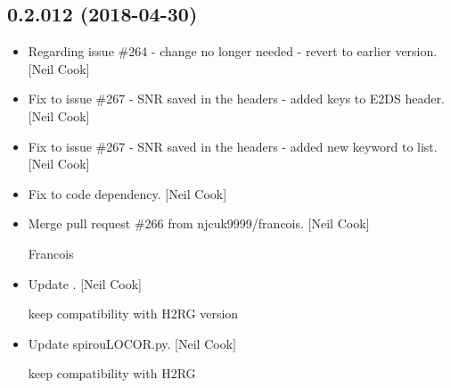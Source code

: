 \documentclass[a4paper,10pt,english]{report}
\begin{document}
\subsection{0.2.012 (2018-04-30)}
\label{\detokenize{misc/changelog:id447}}\begin{itemize}
\item {} 
Regarding issue \#264 - change no longer needed - revert to earlier
version. {[}Neil Cook{]}

\item {} 
Fix to issue \#267 - SNR saved in the headers - added keys to E2DS
header. {[}Neil Cook{]}

\item {} 
Fix to issue \#267 - SNR saved in the headers - added new keyword to
list. {[}Neil Cook{]}

\item {} 
Fix to code dependency. {[}Neil Cook{]}

\item {} 
Merge pull request \#266 from njcuk9999/francois. {[}Neil Cook{]}

Francois

\item {} 
Update . {[}Neil Cook{]}

keep compatibility with H2RG version

\item {} 
Update spirouLOCOR.py. {[}Neil Cook{]}

keep compatibility with H2RG

\end{itemize}
\end{document}
